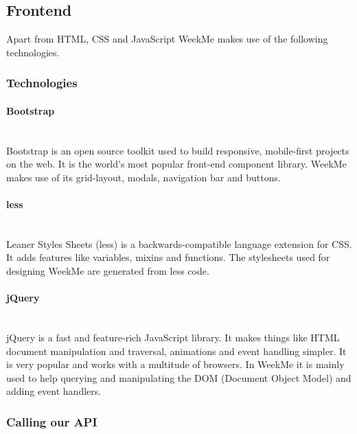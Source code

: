 \subsection{Frontend}
Apart from HTML, CSS and JavaScript WeekMe makes use of the following technologies. 
\subsubsection{Technologies}
\paragraph{Bootstrap}\mbox{}\\
Bootstrap is an open source toolkit used to build responsive, mobile-first projects on the web. 
It is the world’s most popular front-end component library. WeekMe makes use of its grid-layout, modals, navigation bar and buttons.
\cite{bootstrap}

\paragraph{less}\mbox{}\\
Leaner Styles Sheets (less) is a backwards-compatible language extension for CSS. It adds features like variables, mixins and functions.
\cite{less}
The stylesheets used for designing WeekMe are generated from less code. 

\paragraph{jQuery}\mbox{}\\
jQuery is a fast and feature-rich JavaScript library. It makes things like HTML document manipulation and traversal, animations and event handling simpler. It is very popular and works with a multitude of browsers.
\cite{jquery}
In WeekMe it is mainly used to help querying and manipulating the DOM (Document Object Model) and adding event handlers. 

\subsubsection{Calling our API}

